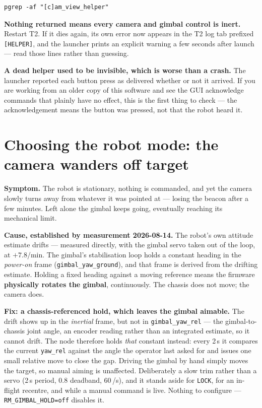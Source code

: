 \documentclass[11pt]{report}
\newenvironment{warningbox}%
  {\begin{lrbox}{\warnbox}\begin{minipage}{0.90\textwidth}}%
  {\end{minipage}\end{lrbox}%
   \begin{center}\fcolorbox{black}{codebg}{\usebox{\warnbox}}\end{center}}
\begin{document}
\begin{lstlisting}[style=shell]
pgrep -af "[c]am_view_helper"
\end{lstlisting}

\textbf{Nothing returned means every camera and gimbal control is inert.}
Restart T2. If it dies again, its own error now appears in the T2 log tab
prefixed \texttt{[HELPER]}, and the launcher prints an explicit warning a
few seconds after launch --- read those lines rather than guessing.

\begin{warningbox}
\textbf{A dead helper used to be invisible, which is worse than a crash.}
The launcher reported each button press as delivered whether or not it
arrived. If you are working from an older copy of this software and see the
GUI acknowledge commands that plainly have no effect, this is the first
thing to check --- the acknowledgement means the button was pressed, not
that the robot heard it.
\end{warningbox}

\section{Choosing the robot mode: the camera wanders off target}
\label{sec:robot-mode}

\textbf{Symptom.} The robot is stationary, nothing is commanded, and yet the
camera slowly turns away from whatever it was pointed at --- losing the beacon
after a few minutes. Left alone the gimbal keeps going, eventually reaching its
mechanical limit.

\textbf{Cause, established by measurement 2026-08-14.} The robot's own
attitude estimate drifts --- measured directly, with the gimbal servo taken out
of the loop, at $+7.8$\textdegree/min. The gimbal's stabilisation loop holds a
constant heading in the \emph{power-on} frame (\texttt{gimbal\_yaw\_ground}),
and that frame is derived from the drifting estimate. Holding a fixed heading
against a moving reference means the firmware \textbf{physically rotates the
gimbal}, continuously. The chassis does not move; the camera does.

\textbf{Fix: a chassis-referenced hold, which leaves the gimbal aimable.}
The drift shows up in the \emph{inertial} frame, but not in
\texttt{gimbal\_yaw\_rel} --- the gimbal-to-chassis joint angle, an encoder
reading rather than an integrated estimate, so it cannot drift. The node
therefore holds \emph{that} constant instead: every 2\,s it compares the
current \texttt{yaw\_rel} against the angle the operator last asked for and
issues one small relative move to close the gap. Driving the gimbal by hand
simply moves the target, so manual aiming is unaffected. Deliberately a slow
trim rather than a servo (2\,s period, 0.8\textdegree{} deadband,
60\,\textdegree/s), and it stands aside for \texttt{LOCK}, for an in-flight
recentre, and while a manual command is live. Nothing to configure ---
\texttt{RM\_GIMBAL\_HOLD=off} disables it.
\end{document}
